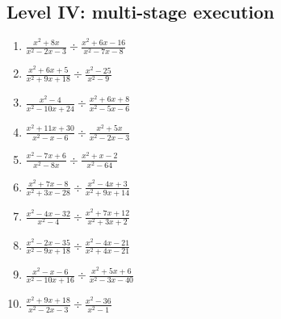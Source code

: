 \documentclass[11pt,oneside]{book}
\begin{document}
\subsection*{Level IV: multi-stage execution}
\begin{enumerate}[leftmargin=*,label=\textbf{\arabic*.},itemsep=0.65\baselineskip]
\item $\displaystyle \frac{x^{2} + 8 x}{x^{2} - 2 x - 3}\div\frac{x^{2} + 6 x - 16}{x^{2} - 7 x - 8}$
\item $\displaystyle \frac{x^{2} + 6 x + 5}{x^{2} + 9 x + 18}\div\frac{x^{2} - 25}{x^{2} - 9}$
\item $\displaystyle \frac{x^{2} - 4}{x^{2} - 10 x + 24}\div\frac{x^{2} + 6 x + 8}{x^{2} - 5 x - 6}$
\item $\displaystyle \frac{x^{2} + 11 x + 30}{x^{2} - x - 6}\div\frac{x^{2} + 5 x}{x^{2} - 2 x - 3}$
\item $\displaystyle \frac{x^{2} - 7 x + 6}{x^{2} - 8 x}\div\frac{x^{2} + x - 2}{x^{2} - 64}$
\item $\displaystyle \frac{x^{2} + 7 x - 8}{x^{2} + 3 x - 28}\div\frac{x^{2} - 4 x + 3}{x^{2} + 9 x + 14}$
\item $\displaystyle \frac{x^{2} - 4 x - 32}{x^{2} - 4}\div\frac{x^{2} + 7 x + 12}{x^{2} + 3 x + 2}$
\item $\displaystyle \frac{x^{2} - 2 x - 35}{x^{2} - 9 x + 18}\div\frac{x^{2} - 4 x - 21}{x^{2} + 4 x - 21}$
\item $\displaystyle \frac{x^{2} - x - 6}{x^{2} - 10 x + 16}\div\frac{x^{2} + 5 x + 6}{x^{2} - 3 x - 40}$
\item $\displaystyle \frac{x^{2} + 9 x + 18}{x^{2} - 2 x - 3}\div\frac{x^{2} - 36}{x^{2} - 1}$
\end{enumerate}
\end{document}
